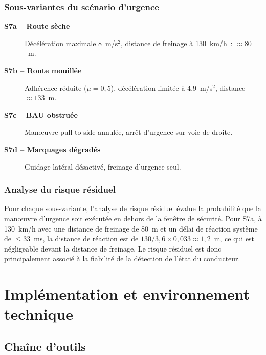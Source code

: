 \documentclass[12pt,a4paper]{report}
\begin{document}
\subsection{Sous-variantes du sc\'enario d'urgence}

\begin{description}
  \item[\textbf{S7a -- Route s\`eche}] D\'ec\'el\'eration maximale 8~m/s$^2$, distance de freinage \`a 130~km/h~: $\approx 80$~m.
  \item[\textbf{S7b -- Route mouill\'ee}] Adh\'erence r\'eduite ($\mu = 0{,}5$), d\'ec\'el\'eration limit\'ee \`a 4{,}9~m/s$^2$, distance $\approx 133$~m.
  \item[\textbf{S7c -- BAU obstru\'ee}] Man\oe uvre pull-to-side annul\'ee, arr\^et d'urgence sur voie de droite.
  \item[\textbf{S7d -- Marquages d\'egrad\'es}] Guidage lat\'eral d\'esactiv\'e, freinage d'urgence seul.
\end{description}

\subsection{Analyse du risque r\'esiduel}

Pour chaque sous-variante, l'analyse de risque r\'esiduel \'evalue la probabilit\'e que la man\oe uvre d'urgence soit ex\'ecut\'ee en dehors de la fen\^etre de s\'ecurit\'e. Pour S7a, \`a 130~km/h avec une distance de freinage de 80~m et un d\'elai de r\'eaction syst\`eme de $\leq 33$~ms, la distance de r\'eaction est de $130/3{,}6 \times 0{,}033 \approx 1{,}2$~m, ce qui est n\'egligeable devant la distance de freinage. Le risque r\'esiduel est donc principalement associ\'e \`a la fiabilit\'e de la d\'etection de l'\'etat du conducteur.

\clearpage


\chapter{Impl\'ementation et environnement technique}

\section{Cha\^ine d'outils}
\end{document}
